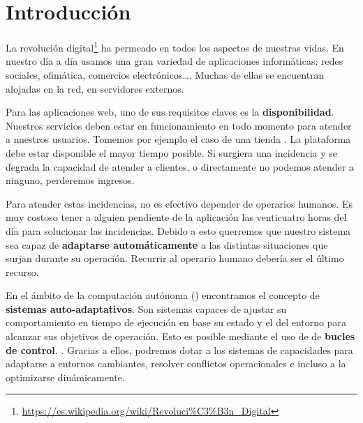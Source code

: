 
\chapter{Introducción}
\label{chap:introduccion}

La revolución digital\footnote{\url{https://es.wikipedia.org/wiki/Revoluci\%C3\%B3n_Digital}} ha permeado en todos los aspectos de nuestras vidas. En nuestro día a día usamos una gran variedad de aplicaciones informáticas: redes sociales, ofimática, comercios electrónicos\dots. Muchas de ellas se encuentran alojadas en la red, en servidores externos.

Para las aplicaciones web, uno de sus requisitos claves es la \textbf{disponibilidad}. \cite{birmanAddingHighAvailability2004} Nuestros servicios deben estar en funcionamiento en todo momento para atender a nuestros usuarios. Tomemos por ejemplo el caso de una tienda . La plataforma debe estar disponible el mayor tiempo posible. Si surgiera una incidencia y se degrada la capacidad de atender a clientes, o directamente no podemos atender a ninguno, perderemos ingresos.

Para atender estas incidencias, no es efectivo depender de operarios humanos. \cite{ibmcorporationArchitecturalBlueprintAutonomic2006} Es muy costoso tener a alguien pendiente de la aplicación las venticuatro horas del día para solucionar las incidencias. Debido a esto querremos que nuestro sistema sea capaz de \textbf{adaptarse automáticamente} a las distintas situaciones que surjan durante su operación. Recurrir al operario humano debería ser el último recurso.

En el ámbito de la computación autónoma () encontramos el concepto de \textbf{sistemas auto-adaptativos}. Son sistemas capaces de ajustar su comportamiento en tiempo de ejecución en base su estado y el del entorno para alcanzar sus objetivos de operación. \cite{ibmcorporationArchitecturalBlueprintAutonomic2006} Esto es posible mediante el uso de de \textbf{bucles de control}. \cite{brunEngineeringSelfAdaptiveSystems2009}. Gracias a ellos, podremos dotar a los sistemas de capacidades para adaptarse a entornos cambiantes, resolver conflictos operacionales e incluso a la optimizarse dinámicamente.

